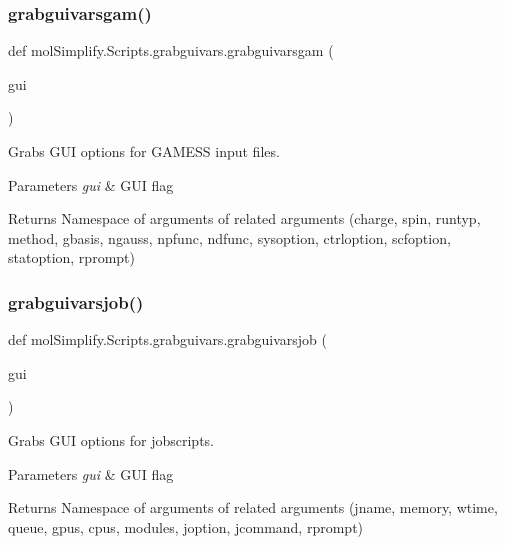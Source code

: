 \subsubsection{\texorpdfstring{grabguivarsgam()}{grabguivarsgam()}}
{\footnotesize\ttfamily def mol\+Simplify.\+Scripts.\+grabguivars.\+grabguivarsgam (\begin{DoxyParamCaption}\item[{}]{gui }\end{DoxyParamCaption})}



Grabs G\+UI options for G\+A\+M\+E\+SS input files. 


\begin{DoxyParams}{Parameters}
{\em gui} & G\+UI flag \\
\hline
\end{DoxyParams}
\begin{DoxyReturn}{Returns}
Namespace of arguments of related arguments (charge, spin, runtyp, method, gbasis, ngauss, npfunc, ndfunc, sysoption, ctrloption, scfoption, statoption, rprompt) 
\end{DoxyReturn}
\mbox{\label{namespacemolSimplify_1_1Scripts_1_1grabguivars_afa035ac059800b0182e88958bc72e807}} 
\subsubsection{\texorpdfstring{grabguivarsjob()}{grabguivarsjob()}}
{\footnotesize\ttfamily def mol\+Simplify.\+Scripts.\+grabguivars.\+grabguivarsjob (\begin{DoxyParamCaption}\item[{}]{gui }\end{DoxyParamCaption})}



Grabs G\+UI options for jobscripts. 


\begin{DoxyParams}{Parameters}
{\em gui} & G\+UI flag \\
\hline
\end{DoxyParams}
\begin{DoxyReturn}{Returns}
Namespace of arguments of related arguments (jname, memory, wtime, queue, gpus, cpus, modules, joption, jcommand, rprompt) 
\end{DoxyReturn}
\mbox{\label{namespacemolSimplify_1_1Scripts_1_1grabguivars_a9f2bf5a0afde2a4349f80be46b34df6e}} 
